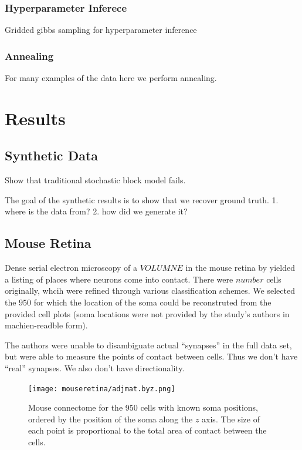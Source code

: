 \documentclass{article}
\begin{document}
\subsubsection{Hyperparameter Inferece}
Gridded gibbs sampling for hyperparameter inference

\subsubsection{Annealing}
For many examples of the data here we perform annealing. 


\section{Results}

\subsection{Synthetic Data}
Show that traditional stochastic block model fails. 


The goal of the synthetic results is to show that we recover ground truth. 
1. where is the data from? 
2. how did we generate it? 


\subsection{Mouse Retina}

Dense serial electron microscopy of a $VOLUMNE$ in the mouse
retina by \autocite{Helmstaedter2013} yielded a listing of places where
neurons come into contact. There were $number$ cells originally, whcih
were refined through various classification schemes. We selected the
$950$ for which the location of the soma could be reconstruted from
the provided cell plots (soma locations were not provided by the
study's authors in machien-readble form).

The authors were unable to disambiguate actual ``synapses'' in the
full data set, but were able to measure the points of contact between
cells. Thus we don't have ``real'' synapses. We also don't have directionality. 

\begin{figure}
  \centering 
  \texttt{[image: mouseretina/adjmat.byz.png]}
  \caption{Mouse connectome for the 950 cells with known soma positions, ordered by the position of the soma along the $z$ axis. The size of each point is proportional to the total area of contact between the cells.}
  \label{fig:mouse_adj}
\end{figure}
\end{document}
